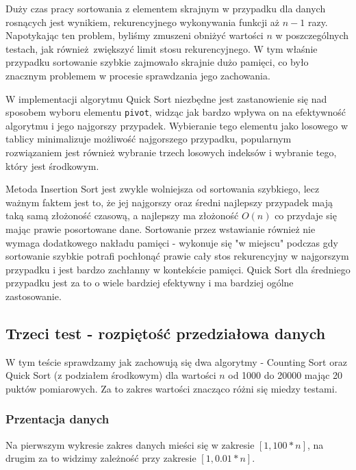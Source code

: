 \documentclass{article}
\begin{document}
Duży czas pracy sortowania z elementem skrajnym w przypadku dla danych rosnących jest wynikiem, rekurencyjnego wykonywania funkcji aż $n-1$ razy. Napotykając ten problem, byliśmy zmuszeni obniżyć wartości $n$ w poszczególnych testach, jak również zwiększyć limit stosu rekurencyjnego. W tym właśnie przypadku sortowanie szybkie zajmowało skrajnie dużo pamięci, co było znacznym problemem w procesie sprawdzania jego zachowania.

W implementacji algorytmu Quick Sort niezbędne jest zastanowienie się nad sposobem wyboru elementu \verb+pivot+, widząc jak bardzo wpływa on na efektywność algorytmu i jego najgorszy przypadek. Wybieranie tego elementu jako losowego w tablicy minimalizuje możliwość najgorszego przypadku, popularnym rozwiązaniem jest również wybranie trzech losowych indeksów i wybranie tego, który jest środkowym.

Metoda Insertion Sort jest zwykle wolniejsza od sortowania szybkiego, lecz ważnym faktem jest to, że jej najgorszy oraz średni najlepszy przypadek mają taką samą złożoność czasową, a najlepszy ma złożoność $O(n)$ co przydaje się mając prawie posortowane dane. Sortowanie przez wstawianie również nie wymaga dodatkowego nakładu pamięci - wykonuje się "w miejscu" podczas gdy sortowanie szybkie potrafi pochłonąć prawie cały stos rekurencyjny w najgorszym przypadku i jest bardzo zachłanny w kontekście pamięci. Quick Sort dla średniego przypadku jest za to o wiele bardziej efektywny i ma bardziej ogólne zastosowanie.

\subsection{Trzeci test - rozpiętość przedziałowa danych}

W tym teście sprawdzamy jak zachowują się dwa algorytmy - Counting Sort oraz Quick Sort (z podziałem środkowym) dla wartości $n$ od 1000 do 20000 mając 20 puktów pomiarowych. Za to zakres wartości znacząco różni się miedzy testami.

\subsubsection{Przentacja danych}

Na pierwszym wykresie zakres danych mieści się w zakresie $[1,100*n]$, na drugim za to widzimy zależność przy zakresie $[1,0.01*n]$.
\end{document}
